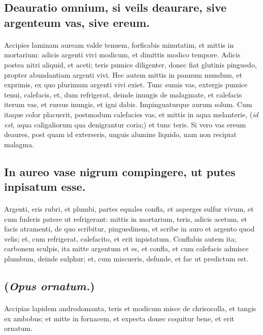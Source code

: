 \documentclass[a4paper, 11pt, oneside, polutonikogreek, italian]{article}
\begin{document}
\subsection{Deauratio omnium, si veils deaurare, sive argenteum vas, sive ereum.}
\paragraph{}
Accipies laminam auream valde tenuem, forficabis minutatim, et mittis in mortarium: adicis argenti vivi modicum, et dimittis modico tempore. Adicis postea nitri aliquid, et aceti; teris pumice diligenter, donec fiat glutinis pinguedo, propter abundantiam argenti vivi. Hec autem mittis in pannum mundum, et exprimis, ex quo plurimum argenti vivi exiet. Tunc sumis vas, extergis pumice tenui, calefacis, et, dum refrigerat, deinde inungis de malagmate, et calefacis iterum vas, et rursus inungis, et igni dabis. Impinguaturque aurum solum. Cum itaque color placuerit, postmodum calefacies vas, et mittis in aqua melanterie, (\emph{id est}, aqua caligaliorum qua denigrantur coria;) et tunc teris. Si vero vas ereum deaures, post quam id exterseris, unguis alumine liquido, nam non recipiat malagma.

\subsection{In aureo vase nigrum compingere, ut putes inpisatum esse.}
\paragraph{}
Argenti, eris rubri, et plumbi, partes equales confla, et asperges sulfur vivum, et cum fuderis patere ut refrigerant: mittis in mortarium, teris, adicis acetum, et facis atramenti, de quo scribitur, pinguedinem, et scribe in auro et argento quod velis; et, cum refrigerat, calefacito, et erit inpistatum. Conflabis autem ita; carbonem sculpis, ita mitte argentum et es, et confla, et cum calefacis admisce plumbum, deinde sulphur; et, cum miscueris, defunde, et fac ut predictum est.

\subsection{(\emph{Opus ornatum.})}
\paragraph{}
Accipias lapidem androdomanta, teris et modicum misce de chrisocolla, et tangis ex ambobus; et mitte in fornacem, et expecta donec coquitur bene, et erit ornatum.
\end{document}
